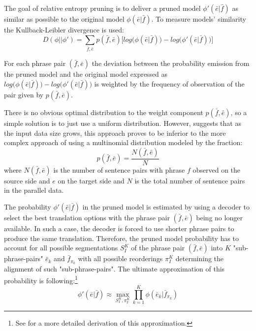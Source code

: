 The goal of relative entropy pruning is to deliver a pruned model $\phi'(\bar{e}|\bar{f})$
as similar as possible to the original model $\phi(\bar{e}|\bar{f})$.
To measure models' similarity the Kullback-Leibler divergence is used:
\begin{equation}
  D(\phi||\phi') = \sum_{\bar{f},\bar{e}}{p(\bar{f},\bar{e}) \Big[log\big(\phi(\bar{e}|\bar{f})\big) - log\big(\phi'(\bar{e}|\bar{f})\big)\Big]}
\end{equation}

For each phrase pair $(\bar{f},\bar{e})$ the deviation between the probability emission
from the pruned model and the original model expressed as
$log\big(\phi(\bar{e}|\bar{f})\big) - log\big(\phi'(\bar{e}|\bar{f})\big)$ is weighted
by the frequency of observation of the pair given by $p(\bar{f}, \bar{e})$.

There is no obvious optimal distribution to the weight component $p(\bar{f}, \bar{e})$,
so a simple solution is to just use a uniform distribution.
However, \citet{ling:relentfilter} suggests that as the input data size grows, this
approach proves to be inferior to the more complex approach of using a multinomial distribution
modeled by the fraction:
\begin{equation}
  p(\bar{f}, \bar{e}) = \frac{N(\bar{f},\bar{e})}{N}
\end{equation}
where $N(\bar{f},\bar{e})$ is the number of sentence pairs with phrase $f$ observed on the
source side and $e$ on the target side and $N$ is the total number of sentence pairs
in the parallel data.

The probability $\phi'(\bar{e}|\bar{f})$ in the pruned model is estimated by using a
decoder to select the best translation options with the phrase pair $(\bar{f},\bar{e})$
being no longer available.
In such a case, the decoder is forced to use shorter phrase pairs to produce the same
translation.
Therefore, the pruned model probability has to account for all possible segmentations
$S_I^K$ of the phrase pair $(\bar{f},\bar{e})$ into $K$ "sub-phrase-pairs"
$\bar{e}_k$ and $\bar{f}_{\pi_k}$ with all possible reorderings $\pi_I^K$ determining
the alignment of such "sub-phrase-pairs".
The ultimate approximation of this probability is following:\footnote{See
\citet{zens:systcomp} for a more detailed derivation of this approximation.}
\begin{equation}
  \phi'(\bar{e}|\bar{f}) \approx \max_{S_I^K,\pi_I^K}{\prod_{k=1}^{K} \phi(\bar{e}_k|\bar{f}_{\pi_k})}
\end{equation}

